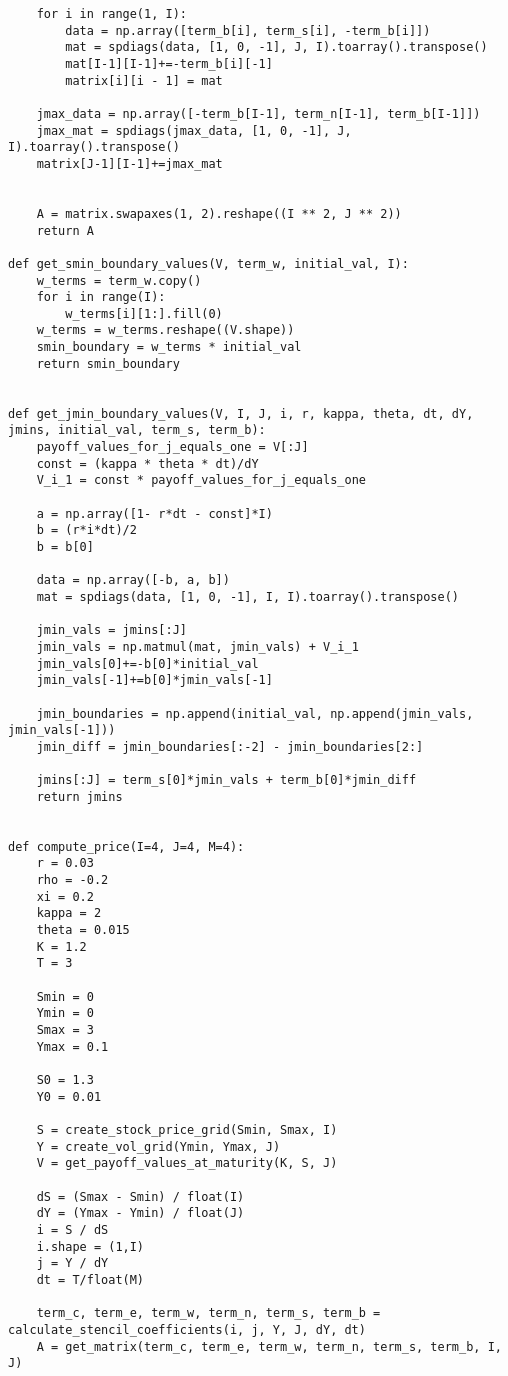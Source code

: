 \documentclass{article}
\begin{document}
\begin{lstlisting}
    for i in range(1, I):
        data = np.array([term_b[i], term_s[i], -term_b[i]])
        mat = spdiags(data, [1, 0, -1], J, I).toarray().transpose()
        mat[I-1][I-1]+=-term_b[i][-1]
        matrix[i][i - 1] = mat

    jmax_data = np.array([-term_b[I-1], term_n[I-1], term_b[I-1]])
    jmax_mat = spdiags(jmax_data, [1, 0, -1], J, I).toarray().transpose()
    matrix[J-1][I-1]+=jmax_mat


    A = matrix.swapaxes(1, 2).reshape((I ** 2, J ** 2))
    return A

def get_smin_boundary_values(V, term_w, initial_val, I):
    w_terms = term_w.copy()
    for i in range(I):
        w_terms[i][1:].fill(0)
    w_terms = w_terms.reshape((V.shape))
    smin_boundary = w_terms * initial_val
    return smin_boundary


def get_jmin_boundary_values(V, I, J, i, r, kappa, theta, dt, dY, jmins, initial_val, term_s, term_b):
    payoff_values_for_j_equals_one = V[:J]
    const = (kappa * theta * dt)/dY
    V_i_1 = const * payoff_values_for_j_equals_one 

    a = np.array([1- r*dt - const]*I)   
    b = (r*i*dt)/2
    b = b[0]

    data = np.array([-b, a, b])
    mat = spdiags(data, [1, 0, -1], I, I).toarray().transpose()

    jmin_vals = jmins[:J]
    jmin_vals = np.matmul(mat, jmin_vals) + V_i_1
    jmin_vals[0]+=-b[0]*initial_val
    jmin_vals[-1]+=b[0]*jmin_vals[-1]

    jmin_boundaries = np.append(initial_val, np.append(jmin_vals, jmin_vals[-1]))
    jmin_diff = jmin_boundaries[:-2] - jmin_boundaries[2:]

    jmins[:J] = term_s[0]*jmin_vals + term_b[0]*jmin_diff
    return jmins


def compute_price(I=4, J=4, M=4):
    r = 0.03
    rho = -0.2
    xi = 0.2
    kappa = 2
    theta = 0.015
    K = 1.2
    T = 3

    Smin = 0
    Ymin = 0
    Smax = 3
    Ymax = 0.1

    S0 = 1.3
    Y0 = 0.01

    S = create_stock_price_grid(Smin, Smax, I)
    Y = create_vol_grid(Ymin, Ymax, J)
    V = get_payoff_values_at_maturity(K, S, J)

    dS = (Smax - Smin) / float(I)
    dY = (Ymax - Ymin) / float(J)
    i = S / dS
    i.shape = (1,I)
    j = Y / dY
    dt = T/float(M)

    term_c, term_e, term_w, term_n, term_s, term_b = calculate_stencil_coefficients(i, j, Y, J, dY, dt)
    A = get_matrix(term_c, term_e, term_w, term_n, term_s, term_b, I, J)


\end{lstlisting}
\end{document}
